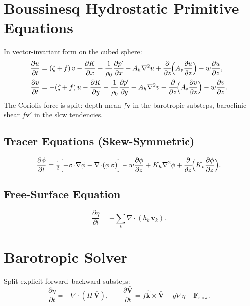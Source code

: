 \documentclass[11pt,twoside]{report}
\newcommand{\pp}{\partial}
\newcommand{\half}{\tfrac{1}{2}}
\newcommand{\vect}[1]{\bm{#1}}
\newcommand{\grad}{\nabla}
\newcommand{\divg}{\nabla\!\cdot\!}
\begin{document}
\section{Boussinesq Hydrostatic Primitive Equations}

In vector-invariant form on the cubed sphere:
\begin{align}
  \frac{\pp u}{\pp t} &= (\zeta+f)\,v - \frac{\pp K}{\pp x}
  - \frac{1}{\rho_0}\frac{\pp p'}{\pp x}
  + A_h\nabla^2 u + \frac{\pp}{\pp z}\!\Bigl(A_v\frac{\pp u}{\pp z}\Bigr)
  - w\frac{\pp u}{\pp z}, \\
  \frac{\pp v}{\pp t} &= -(\zeta+f)\,u - \frac{\pp K}{\pp y}
  - \frac{1}{\rho_0}\frac{\pp p'}{\pp y}
  + A_h\nabla^2 v + \frac{\pp}{\pp z}\!\Bigl(A_v\frac{\pp v}{\pp z}\Bigr)
  - w\frac{\pp v}{\pp z}.
\end{align}
The Coriolis force is split: depth-mean $f\vect{v}$ in the barotropic
substeps, baroclinic shear $f\vect{v}'$ in the slow tendencies.

\subsection{Tracer Equations (Skew-Symmetric)}
\begin{equation}
  \frac{\pp\phi}{\pp t} = \half\Bigl[-\vect{v}\!\cdot\!\grad\phi
  - \divg(\phi\,\vect{v})\Bigr]
  - w\frac{\pp\phi}{\pp z}
  + K_h\nabla^2\phi
  + \frac{\pp}{\pp z}\!\Bigl(K_v\frac{\pp\phi}{\pp z}\Bigr).
\end{equation}

\subsection{Free-Surface Equation}
\begin{equation}
  \frac{\pp\eta}{\pp t} = -\sum_k \divg(h_k\,\vect{v}_k).
\end{equation}


\section{Barotropic Solver}
\label{sec:barotropic}

Split-explicit forward--backward substeps:
\begin{equation}
  \frac{\pp\eta}{\pp t} = -\divg(H\,\bar{\vect{V}}),
  \qquad
  \frac{\pp\bar{\vect{V}}}{\pp t} = f\hat{\vect{k}}\times\bar{\vect{V}}
  - g\grad\eta + \vect{F}_{\mathrm{slow}}.
\end{equation}
\end{document}
